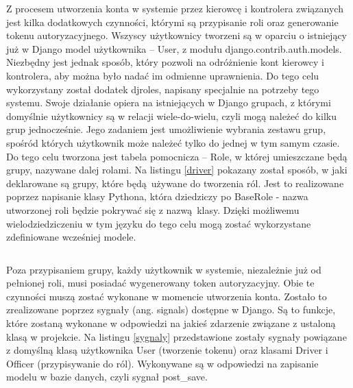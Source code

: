 Z procesem utworzenia konta w systemie przez kierowcę i kontrolera związanych jest kilka dodatkowych czynności, którymi są przypisanie roli oraz generowanie tokenu autoryzacyjnego. Wszyscy użytkownicy tworzeni są w oparciu o istniejący już w Django model użytkownika -- User, z modułu django.contrib.auth.models. Niezbędny jest jednak sposób, który pozwoli na odróżnienie kont kierowcy i kontrolera, aby można było nadać im odmienne uprawnienia. Do tego celu wykorzystany został dodatek djroles, napisany specjalnie na potrzeby tego systemu. Swoje działanie opiera na istniejących w Django grupach, z którymi domyślnie użytkownicy są w relacji wiele-do-wielu, czyli mogą należeć do kilku grup jednocześnie. Jego zadaniem jest umożliwienie wybrania zestawu grup, spośród których użytkownik może należeć tylko do jednej w tym samym czasie. Do tego celu tworzona jest tabela pomocnicza -- Role, w której umieszczane będą grupy, nazywane dalej rolami. Na listingu \ref{driver} pokazany został sposób, w jaki deklarowane są grupy, które będą używane do tworzenia ról. Jest to realizowane poprzez napisanie klasy Pythona, która dziedziczy po BaseRole - nazwa utworzonej roli będzie pokrywać się z nazwą klasy. Dzięki możliwemu wielodziedziczeniu w tym języku do tego celu mogą zostać wykorzystane zdefiniowane wcześniej modele.

\begin{singlespace}
	\label{driver}
	\vspace{0.3cm}
	\inputminted[fontsize=\footnotesize]{python}{src/imp/driver.py}
\end{singlespace}

\vspace{0.3cm}

Poza przypisaniem grupy, każdy użytkownik w systemie, niezależnie już od pełnionej roli, musi posiadać wygenerowany token autoryzacyjny. Obie te czynności muszą zostać wykonane w momencie utworzenia konta. Zostało to zrealizowane poprzez sygnały (ang. signals) dostępne w Django. Są to funkcje, które zostaną wykonane w odpowiedzi na jakieś zdarzenie związane z ustaloną klasą w projekcie. Na listingu \ref{sygnaly} przedstawione zostały sygnały powiązane z domyślną klasą użytkownika User (tworzenie tokenu) oraz klasami Driver i Officer (przypisywanie do ról). Wykonywane są w odpowiedzi na zapisanie modelu w bazie danych, czyli sygnał post\_save.

\begin{singlespace}
	\label{sygnaly}
	\vspace{0.3cm}
	\inputminted[fontsize=\footnotesize]{python}{src/imp/token_signal.py}
\end{singlespace}

